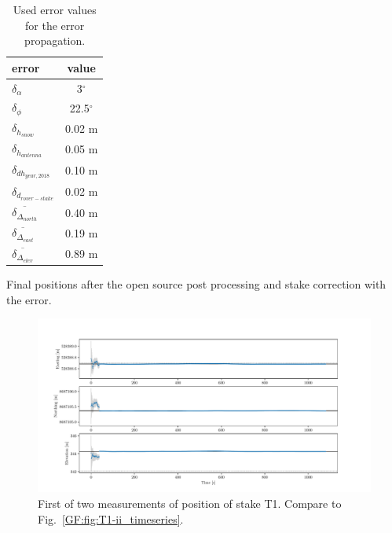 \begin{table}[h]
	\caption{Used error values for the error propagation.}
	\centering
	\begin{tabular}{lc}
	\toprule
        error &  value \\
	\midrule
    $ \delta_{\alpha} $ &  3$^{\circ}$ \\
    $ \delta_{\phi} $ &  22.5$^{\circ}$ \\
    $ \delta_{h_{snow}}$ &  0.02 m \\
    $ \delta_{h_{antenna}} $ &  0.05 m \\
    $ \delta_{dh_{year,2018}} $ &  0.10 m \\
    $ \delta_{d_{rover-stake}} $ &  0.02 m \\
    $ \overline{\delta_{\Delta_{north}}} $ & 0.40 m \\
    $ \overline{\delta_{\Delta_{east}}} $ & 0.19 m \\
    $ \overline{\delta_{\Delta_{elev}}} $ & 0.89 m \\
    \bottomrule
\end{tabular}
	\label{GPS:tab:err}
\end{table}

\begin{table}[h]
	\caption{Final positions after the open source post processing and stake correction with the error.}
	\centering
	
	\label{GPS:tab:os_tab}
\end{table}


\begin{figure}[H]
    \centering
    \includegraphics[width=\textwidth]{./figs/timeseries/46250700_corr-T1-i-2017_Timeseries-east-north-elev.pdf}
    \caption{First of two measurements of position of stake T1. Compare to Fig.~\ref{GF:fig:T1-ii_timeseries}.}
    \label{GF:fig:T1-i_timeseries}
\end{figure}


